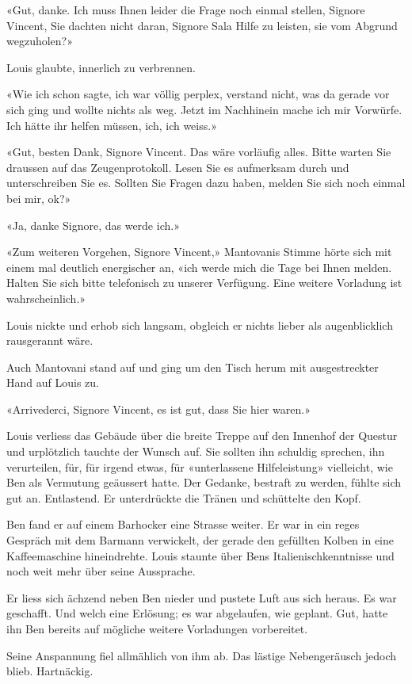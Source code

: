 «Gut, danke. Ich muss Ihnen leider die Frage noch einmal stellen,
Signore Vincent, Sie dachten nicht daran, Signore Sala Hilfe zu leisten,
sie vom Abgrund wegzuholen?»

Louis glaubte, innerlich zu verbrennen.

«Wie ich schon sagte, ich war völlig perplex, verstand nicht, was da
gerade vor sich ging und wollte nichts als weg. Jetzt im Nachhinein
mache ich mir Vorwürfe. Ich hätte ihr helfen müssen, ich, ich weiss.»

«Gut, besten Dank, Signore Vincent. Das wäre vorläufig alles. Bitte
warten Sie draussen auf das Zeugenprotokoll. Lesen Sie es aufmerksam
durch und unterschreiben Sie es. Sollten Sie Fragen dazu haben, melden
Sie sich noch einmal bei mir, ok?»

«Ja, danke Signore, das werde ich.»

«Zum weiteren Vorgehen, Signore Vincent,» Mantovanis Stimme hörte sich
mit einem mal deutlich energischer an, «ich werde mich die Tage bei
Ihnen melden. Halten Sie sich bitte telefonisch zu unserer Verfügung.
Eine weitere Vorladung ist wahrscheinlich.»

Louis nickte und erhob sich langsam, obgleich er nichts lieber als
augenblicklich rausgerannt wäre.

Auch Mantovani stand auf und ging um den Tisch herum mit ausgestreckter
Hand auf Louis zu.

«Arrivederci, Signore Vincent, es ist gut, dass Sie hier waren.»

Louis verliess das Gebäude über die breite Treppe auf den Innenhof der
Questur und urplötzlich tauchte der Wunsch auf. Sie sollten ihn schuldig
sprechen, ihn verurteilen, für, für irgend etwas, für «unterlassene
Hilfeleistung» vielleicht, wie Ben als Vermutung geäussert hatte. Der
Gedanke, bestraft zu werden, fühlte sich gut an. Entlastend. Er
unterdrückte die Tränen und schüttelte den Kopf.

Ben fand er auf einem Barhocker eine Strasse weiter. Er war in ein reges
Gespräch mit dem Barmann verwickelt, der gerade den gefüllten Kolben in
eine Kaffeemaschine hineindrehte. Louis staunte über Bens
Italienischkenntnisse und noch weit mehr über seine Aussprache.

Er liess sich ächzend neben Ben nieder und pustete Luft aus sich heraus.
Es war geschafft. Und welch eine Erlösung; es war abgelaufen, wie
geplant. Gut, hatte ihn Ben bereits auf mögliche weitere Vorladungen
vorbereitet.

Seine Anspannung fiel allmählich von ihm ab. Das lästige Nebengeräusch
jedoch blieb. Hartnäckig.

